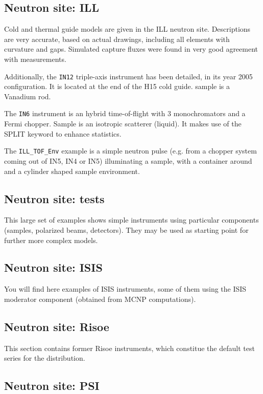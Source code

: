 \subsection{Neutron site: ILL}

Cold and thermal guide models are given in the ILL neutron site. Descriptions are very accurate, based on actual drawings, including all elements with curvature and gaps. Simulated capture fluxes were found in very good agreement with measurements.

Additionally, the \verb+IN12+ triple-axis instrument has been detailed, in its year 2005 configuration. It is located at the end of the H15 cold guide. sample is a Vanadium rod.

The \verb+IN6+ instrument is an hybrid time-of-flight with 3 monochromators and a Fermi chopper. Sample is an isotropic scatterer (liquid). It makes use of the SPLIT keyword to enhance statistics.

The \verb+ILL_TOF_Env+ example is a simple neutron pulse (e.g. from a chopper system coming out of IN5, IN4 or IN5) illuminating a sample, with a container around and a cylinder shaped sample environment.

\subsection{Neutron site: tests}

This large set of examples shows simple instruments using particular components (samples, polarized beams, detectors). They may be used as starting point for further more complex models.

\subsection{Neutron site: ISIS}

You will find here examples of ISIS instruments, some of them using the ISIS moderator component (obtained from MCNP computations).

\subsection{Neutron site: Risoe}

This section contains former Risoe instruments, which constitue the default test series for the \MCS distribution.

\subsection{Neutron site: PSI}

